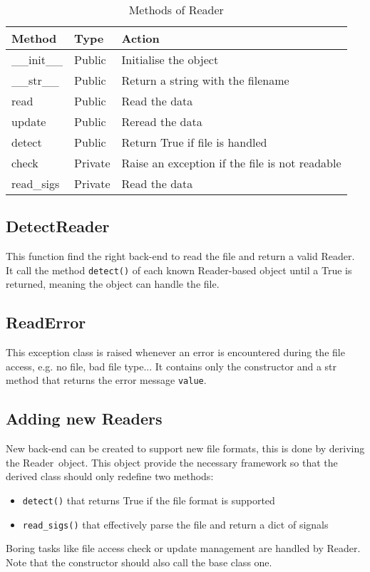 \documentclass[a4paper,11pt]{article}
\newcommand{\att}[1]{\texttt{#1}}
\newcommand{\meth}[1]{\texttt{#1()}}
\newcommand{\rds}{\textsf{Reader}}
\begin{document}
\begin{table}[htbp]
  \centering\sf\small
  \begin{tabular}{lll}
    \hline
    Method & Type & Action \\
    \hline
    \_\_init\_\_ & Public & Initialise the object \\
    \_\_str\_\_  & Public & Return a string with the filename\\
    read         & Public & Read the data\\
    update       & Public & Reread the data\\
    detect       & Public & Return True if file is handled\\
    check        & Private& Raise an exception if the file is not readable\\
    read\_sigs    & Private& Read the data \\
    \hline
  \end{tabular}
  \caption{Methods of \rds}
  \label{tab:rds:meth}
\end{table}

\subsection{DetectReader}
\label{sec:readers:detect}
This function find the right back-end to read the file and return a valid \rds.
It call the method \meth{detect} of each known \rds-based object until a True is returned, meaning the object can handle the file.

\subsection{ReadError}
\label{sec:readers:readerror}
This exception class is raised whenever an error is encountered during the file access, e.g. no file, bad file type...
It contains only the constructor and a str method that returns the error message \att{value}.

\subsection{Adding new Readers}
\label{sec:readers:add}
New back-end can be created to support new file formats, this is done by deriving the \rds\ object.
This object provide the necessary framework so that the derived class should only redefine two methods:
\begin{itemize}
\item \meth{detect} that returns True if the file format is supported
\item \meth{read\_sigs} that effectively parse the file and return a dict of signals
\end{itemize}
Boring tasks like file access check or update management are handled by \rds.
Note that the constructor should also call the base class one.
\end{document}
